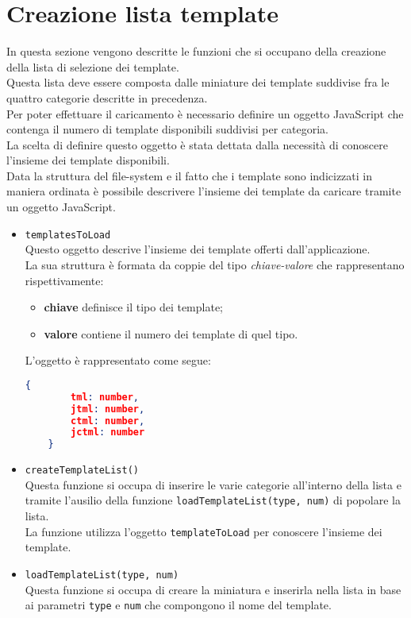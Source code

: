 \section{Creazione lista template}
In questa sezione vengono descritte le funzioni che si occupano della creazione della lista di selezione dei template.\\
Questa lista deve essere composta dalle miniature dei template suddivise fra le quattro categorie descritte in precedenza.\\
Per poter effettuare il caricamento è necessario definire un oggetto JavaScript che contenga il numero di template disponibili suddivisi per categoria.\\
La scelta di definire questo oggetto è stata dettata dalla necessità di conoscere l'insieme dei template disponibili.\\
Data la struttura del file-system e il fatto che i template sono indicizzati in maniera ordinata è possibile descrivere l'insieme dei template da caricare tramite un oggetto JavaScript.\\

\begin{itemize}
	\item \texttt{templatesToLoad}\\
	Questo oggetto descrive l'insieme dei template offerti dall'applicazione.\\
	La sua struttura è formata da coppie del tipo \textit{chiave-valore} che rappresentano rispettivamente:
	\begin{itemize}
		\item \textbf{chiave} definisce il tipo dei template;
		\item \textbf{valore} contiene il numero dei template di quel tipo.
	\end{itemize}
	L'oggetto è rappresentato come segue:
	\begin{lstlisting}[language=JSON, caption= Struttura oggetto \texttt{templatesToLoad}.]
	{
		tml: number,
		jtml: number,
		ctml: number,
		jctml: number
	}
	\end{lstlisting}
	
	\item \texttt{createTemplateList()}\\
	Questa funzione si occupa di inserire le varie categorie all'interno della lista e tramite l'ausilio della funzione \texttt{loadTemplateList(type, num)} di popolare la lista.\\
	La funzione utilizza l'oggetto \texttt{templateToLoad} per conoscere l'insieme dei template.
	
	\item \texttt{loadTemplateList(type, num)}\\
	Questa funzione si occupa di creare la miniatura e inserirla nella lista in base ai parametri \texttt{type} e \texttt{num} che compongono il nome del template.
\end{itemize}

